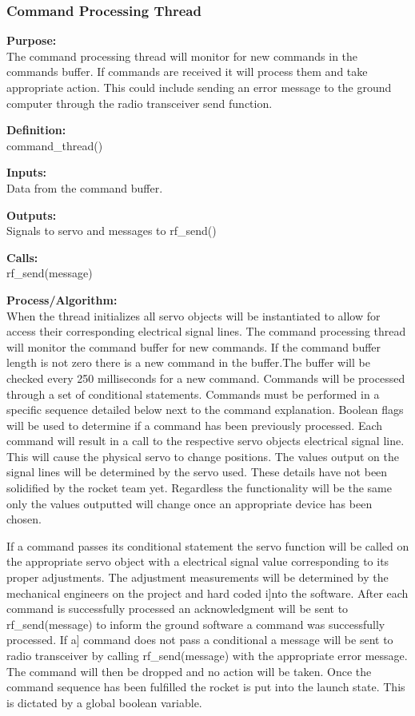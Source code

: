 \documentclass[10pt,draftclsnofoot,onecolumn,compsoc]{IEEEtran}
\begin{document}
\subsubsection{Command Processing Thread}
{\bf Purpose:} \\
The command processing thread will monitor for new commands in the commands buffer. If commands are received it will process them and take appropriate action. This could include sending an error message to the ground computer through the radio transceiver send function. \par
{\bf Definition:} \\ 
command\_thread() \par
{\bf Inputs:} \\  Data from the command buffer. \par
{\bf Outputs:} \\ Signals to servo and messages to rf\_send() \par
{\bf Calls:} \\ 
rf\_send(message)  \par
{\bf Process/Algorithm:} \\
When the thread initializes all servo objects will be instantiated to allow for access their corresponding electrical signal lines. The command processing thread will monitor the command buffer for new commands. If the command buffer length is not zero there is a new command in the buffer.The buffer will be checked  every 250 milliseconds for a new command. Commands will be processed through a set of conditional statements. Commands must be performed in a specific sequence detailed below next to the command explanation. Boolean flags will be used to determine if a command has been previously processed.  Each command will result in a call to the respective servo objects electrical signal line. This will cause the physical servo to change positions. The values output on the signal lines will be determined by the servo used. These details have not been solidified by the rocket team yet. Regardless the functionality will be the same only the values outputted will change once an appropriate device has been chosen. \par
If a command passes its conditional statement the servo function will be called on the appropriate servo object with a electrical signal value corresponding to its proper adjustments. The adjustment measurements will be determined by the mechanical engineers on the project and hard coded i]nto the software. After each command is successfully processed an acknowledgment will be sent to rf\_send(message) to inform the ground software a command was successfully processed. If a] command does not pass a conditional a message will be sent to radio transceiver by calling rf\_send(message) with the appropriate error message. The command will then be dropped and no action will be taken. Once the command sequence has been fulfilled the rocket is put into the launch state. This is dictated by a global boolean variable.\par
\end{document}
